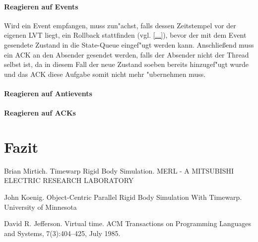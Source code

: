 \documentclass[a4paper, 10pt, openright, parskip, chapterprefix]{scrreprt}
\begin{document}
\subsubsection{Reagieren auf Events}
Wird ein Event empfangen, muss zun"achst, falls dessen Zeitstempel vor der eigenen LVT liegt, 
ein Rollback stattfinden (vgl. \ref{...}), bevor der mit dem Event gesendete
Zustand in die State-Queue eingef"ugt werden kann. Anschlie\ss end muss ein ACK an den Absender gesendet werden, falls
der Absender nicht der Thread selbst ist, da in diesem Fall der neue Zustand soeben
bereits hinzugef"ugt wurde und das ACK diese Aufgabe somit nicht mehr "ubernehmen muss.

\subsubsection{Reagieren auf Antievents}

\subsubsection{Reagieren auf ACKs}
\label{subsubsed:ReagierenAufACKs}

\chapter{Fazit}
\begin{thebibliography}{10}
Brian Mirtich. Timewarp Rigid Body Simulation. MERL - A MITSUBISHI ELECTRIC RESEARCH LABORATORY

John Koenig. Object-Centric Parallel Rigid Body Simulation With Timewarp. University of Minnesota

David R. Jefferson. Virtual time. ACM Transactions on Programming Languages and Systems, 7(3):404–425, July 1985.
\end{thebibliography}
\end{document}
